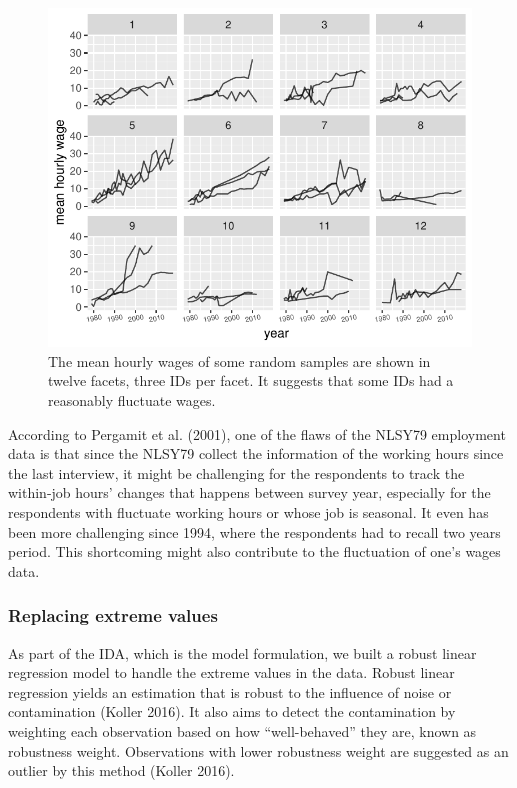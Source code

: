 \documentclass{article}
\begin{document}
\begin{figure}
\centering
\includegraphics{figures/sample-plot-1.pdf}
\caption{\label{fig:sample-plot}The mean hourly wages of some random samples are shown in twelve facets, three IDs per facet. It suggests that some IDs had a reasonably fluctuate wages.}
\end{figure}

According to Pergamit et al. (2001), one of the flaws of the NLSY79 employment data is that since the NLSY79 collect the information of the working hours since the last interview, it might be challenging for the respondents to track the within-job hours' changes that happens between survey year, especially for the respondents with fluctuate working hours or whose job is seasonal. It even has been more challenging since 1994, where the respondents had to recall two years period. This shortcoming might also contribute to the fluctuation of one's wages data.

\hypertarget{replacing-extreme-values}{%
\subsubsection{Replacing extreme values}\label{replacing-extreme-values}}

As part of the IDA, which is the model formulation, we built a robust linear regression model to handle the extreme values in the data. Robust linear regression yields an estimation that is robust to the influence of noise or contamination (Koller 2016). It also aims to detect the contamination by weighting each observation based on how ``well-behaved'' they are, known as robustness weight. Observations with lower robustness weight are suggested as an outlier by this method (Koller 2016).
\end{document}

